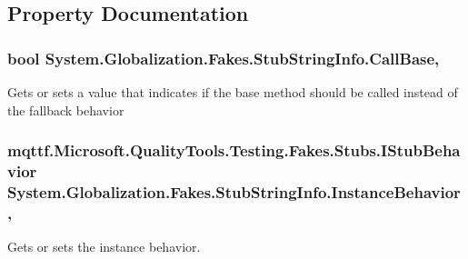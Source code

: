 \subsection{Property Documentation}
\hypertarget{class_system_1_1_globalization_1_1_fakes_1_1_stub_string_info_a25dcc073728b5c86c62989203bf4335a}{
\subsubsection[{Call\-Base}]{\setlength{\rightskip}{0pt plus 5cm}bool System.\-Globalization.\-Fakes.\-Stub\-String\-Info.\-Call\-Base\hspace{0.3cm}{\ttfamily [get]}, {\ttfamily [set]}}}\label{class_system_1_1_globalization_1_1_fakes_1_1_stub_string_info_a25dcc073728b5c86c62989203bf4335a}


Gets or sets a value that indicates if the base method should be called instead of the fallback behavior

\hypertarget{class_system_1_1_globalization_1_1_fakes_1_1_stub_string_info_ac1c0666a9f16a542fcf6e8ad1ffc7bae}{
\subsubsection[{Instance\-Behavior}]{\setlength{\rightskip}{0pt plus 5cm}mqttf.\-Microsoft.\-Quality\-Tools.\-Testing.\-Fakes.\-Stubs.\-I\-Stub\-Behavior System.\-Globalization.\-Fakes.\-Stub\-String\-Info.\-Instance\-Behavior\hspace{0.3cm}{\ttfamily [get]}, {\ttfamily [set]}}}\label{class_system_1_1_globalization_1_1_fakes_1_1_stub_string_info_ac1c0666a9f16a542fcf6e8ad1ffc7bae}


Gets or sets the instance behavior.

